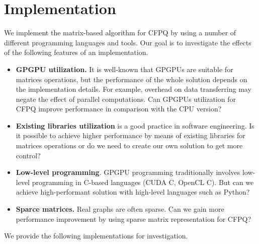 \section{Implementation}

We implement the matrix-based algorithm for CFPQ by using a number of different programming languages and tools.
Our goal is to investigate the effects of the following features of an implementation.
\begin{itemize}
\item \textbf{GPGPU utilization.}
It is well-known that GPGPUs are suitable for matrices operations, but the performance of the whole solution depends on the implementation details. For example, overhead on data transferring may negate the effect of parallel computations.
Can GPGPUs utilization for CFPQ improve performance in comparison with the CPU version?

\item \textbf{Existing libraries utilization} is a good practice in software engineering.
Is it possible to achieve higher performance by means of existing libraries for matrices operations or do we need to create our own solution to get more control?

\item \textbf{Low-level programming}.
GPGPU programming traditionally involves low-level programming in C-based languages (CUDA C, OpenCL C).
But can we achieve high-performant solution with high-level languages such as Python?

\item \textbf{Sparce matrices.} Real graphs are often sparse.
Can we gain more performance improvement by using sparse matrix representation for CFPQ?

\end{itemize}

We provide the following implementations for investigation.

